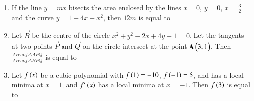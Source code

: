 \documentclass[journal]{IEEEtran}
\begin{document}
\begin{enumerate}
	\item 
	If the line $y = mx$ bisects the area enclosed by the lines $x = 0$, $y = 0$, $x = \frac{3}{2}$ and the curve $y = 1 + 4x - x^{2}$, then $12m$ is equal to 
	\item 
	Let $\vec{B}$ be the centre of the circle $x^2+ y^2 - 2x + 4y + 1 = 0$. Let the tangents at two points $\vec{P}$ and $\vec{Q}$ on the circle intersect at the point $\mathbf{A}\begin{pmatrix}3 , 1\end{pmatrix}$. Then $\frac{Area of \Delta APQ}{Area of \Delta BPQ}$ is equal to
	\item 
 	Let $f\left(x\right)$ be a cubic polynomial with $f\left(1\right) = -10$, $f\left(-1\right) = 6$, and has a local minima at $x = 1$, and $f^{\prime}\left(x\right)$ has a local minima at $x = -1$. Then $f\left(3\right)$ is equal to 
\end{enumerate}
\end{document}
